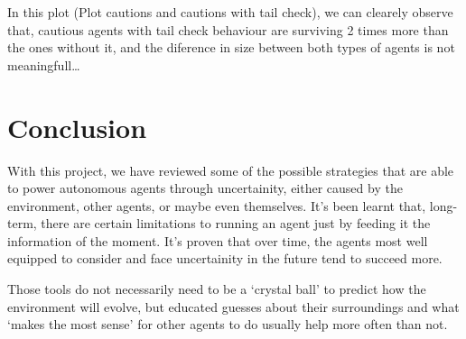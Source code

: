 In this plot (Plot cautions and cautions with tail check), we can clearely observe that, cautious agents with tail check behaviour are surviving 2 times more than the ones without it, and the diference in size between both types of agents is not meaningfull\dots



\section{Conclusion}

With this project, we have reviewed some of the possible strategies that are able to power autonomous agents through uncertainity, either caused by the environment,
other agents, or maybe even themselves. It's been learnt that, long-term, there are certain limitations to running an agent just by feeding it the
information of the moment. It's proven that over time, the agents most well equipped to consider and face uncertainity in the future tend to succeed more.

Those tools do not necessarily need to be a `crystal ball' to predict how the environment will evolve, but educated guesses about their surroundings and what
`makes the most sense' for other agents to do usually help more often than not.
